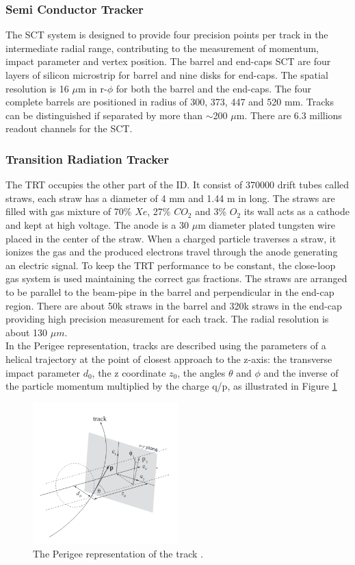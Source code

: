 \subsubsection{Semi Conductor Tracker}
\label{chap2:ATLAS:ITK:SCT}
The SCT system is designed to provide four precision points per track in the intermediate radial range, contributing to the measurement of momentum, impact parameter and vertex position. The barrel and end-caps SCT are four layers of silicon microstrip for barrel and nine disks for end-caps. The spatial resolution is 16 $\mu$m in r-$\phi$ for both the barrel and the end-caps. The four complete barrels are positioned in radius of 300, 373, 447 and 520 mm. Tracks can be distinguished if separated by more than $\sim$200 $\mu$m. There are 6.3 millions readout channels for the SCT.
\subsubsection{Transition Radiation Tracker}
The TRT occupies the other part of the ID. It consist of 370000 drift tubes called straws, each straw has a diameter of 4 mm and 1.44 m in long. The straws are filled with gas mixture of 70\% $Xe$, 27\% $CO_2$ and 3\% $O_2$ its wall acts as a cathode and kept at high voltage. The anode is a 30 $\mu$m diameter plated tungsten wire placed in the center of the straw. When a charged particle traverses a straw, it ionizes the gas and the produced electrons travel through the anode generating an electric signal. To keep the TRT performance to be constant, the close-loop gas system is used maintaining the correct gas fractions. The straws are arranged to be parallel to the beam-pipe in the barrel and perpendicular in the end-cap region. There are about 50k straws in the barrel and 320k straws in the end-cap providing high precision measurement for each track. The radial resolution is about 130 $\mu m$. \\
In the Perigee representation, tracks are described using the parameters of a helical trajectory at the point of closest approach to the z-axis: the transverse impact parameter $d_0$, the z coordinate $z_0$, the angles $\theta$ and $\phi$ and the inverse of the particle momentum multiplied by the charge q/p, as illustrated in Figure \ref{fig:chap2:ATLAS:ITK:Trk}
\begin{figure}[ht]
    \centering
    \includegraphics[width=0.5\textwidth]{Ch2/Img/Track.png}
    \caption{The Perigee representation of the track \cite{Track_schema}.}
    \label{fig:chap2:ATLAS:ITK:Trk}
\end{figure}
